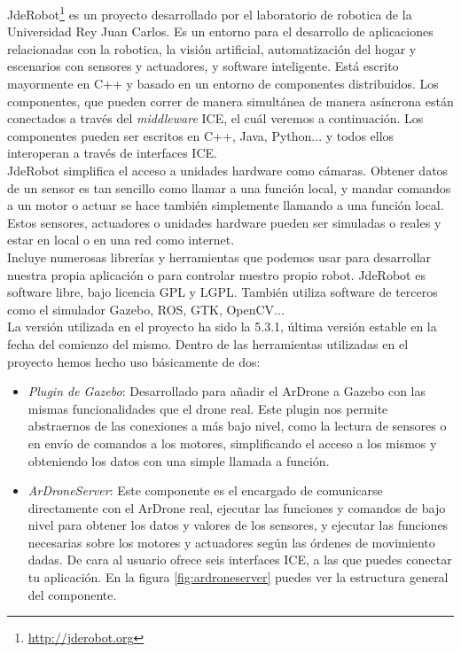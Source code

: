 JdeRobot\footnote{\url{http://jderobot.org}}\cite{jderobot} es un proyecto desarrollado por el laboratorio de robotica de la Universidad Rey Juan Carlos. Es un entorno para el desarrollo de aplicaciones relacionadas con la robotica, la visión artificial, automatización del hogar y escenarios con sensores y actuadores, y software inteligente. Está escrito mayormente en C++ y basado en un entorno de componentes distribuidos. Los componentes, que pueden correr de manera simultánea de manera asíncrona están conectados a través del \emph{middleware} ICE, el cuál veremos a continuación. Los componentes pueden ser escritos en C++, Java, Python... y todos ellos interoperan a través de interfaces ICE.\\

JdeRobot simplifica el acceso a unidades hardware como cámaras. Obtener datos de un sensor es tan sencillo como llamar a una función local, y mandar comandos a un motor o actuar se hace también simplemente llamando a una función local. Estos sensores, actuadores o unidades hardware pueden ser simuladas o reales y estar en local o en una red como internet.\\

Incluye numerosas librerías y herramientas que podemos usar para desarrollar nuestra propia aplicación o para controlar nuestro propio robot. JdeRobot es software libre, bajo licencia GPL y LGPL. También utiliza software de terceros como el simulador Gazebo, ROS, GTK, OpenCV...\\

La versión utilizada en el proyecto ha sido la 5.3.1, última versión estable en la fecha del comienzo del mismo. Dentro de las herramientas utilizadas en el proyecto hemos hecho uso básicamente de dos:

\begin{itemize}
\item \emph{Plugin de Gazebo}: Desarrollado para añadir el ArDrone a Gazebo con las mismas funcionalidades que el drone real. Este plugin nos permite abstraernos de las conexiones a más bajo nivel, como la lectura de sensores o en envío de comandos a los motores, simplificando el acceso a los mismos y obteniendo los datos con una simple llamada a función.

\item \emph{ArDroneServer}: Este componente es el encargado de comunicarse directamente con el ArDrone real, ejecutar las funciones y comandos de bajo nivel para obtener los datos y valores de los sensores, y ejecutar las funciones necesarias sobre los motores y actuadores según las órdenes de movimiento dadas. De cara al usuario ofrece seis interfaces ICE, a las que puedes conectar tu aplicación. En la figura \ref{fig:ardroneserver} puedes ver la estructura general del componente.
\end{itemize}

